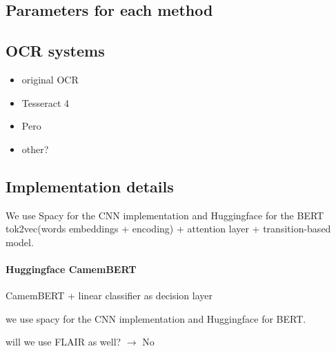 \subsection{Parameters for each method}

\subsection{OCR systems}
\begin{itemize}
    \item original OCR
    \item Tesseract 4
    \item Pero
    \item other?
\end{itemize}

\subsection{Implementation details}
We use Spacy for the CNN implementation
and Huggingface for the BERT 
tok2vec(words embeddings + encoding) + attention layer  +  transition-based model.

\paragraph{Huggingface CamemBERT}
CamemBERT + linear classifier as decision layer



we use spacy  for the CNN implementation and Huggingface for BERT.

will we use FLAIR as well? $\rightarrow$ No